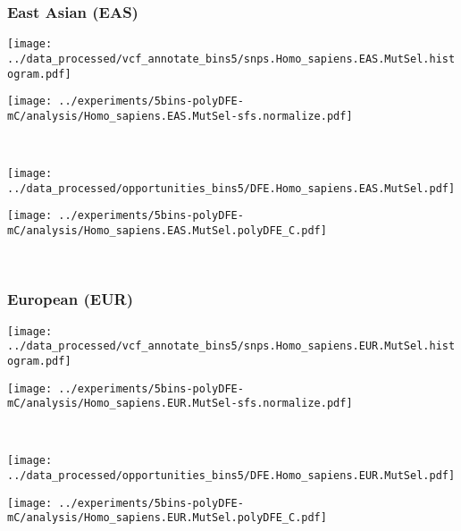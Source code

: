 \subsubsection{East Asian (EAS)}

\begin{minipage}{0.49\linewidth}
    \texttt{[image: ../data\_processed/vcf\_annotate\_bins5/snps.Homo\_sapiens.EAS.MutSel.histogram.pdf]}
\end{minipage}
\begin{minipage}{0.49\linewidth}
    \texttt{[image: ../experiments/5bins-polyDFE-mC/analysis/Homo\_sapiens.EAS.MutSel-sfs.normalize.pdf]}
\end{minipage}
\\
\begin{minipage}{0.49\linewidth}
    \texttt{[image: ../data\_processed/opportunities\_bins5/DFE.Homo\_sapiens.EAS.MutSel.pdf]}
\end{minipage}
\begin{minipage}{0.49\linewidth}
    \texttt{[image: ../experiments/5bins-polyDFE-mC/analysis/Homo\_sapiens.EAS.MutSel.polyDFE\_C.pdf]}
\end{minipage}
\\

\subsubsection{European (EUR)}

\begin{minipage}{0.49\linewidth}
    \texttt{[image: ../data\_processed/vcf\_annotate\_bins5/snps.Homo\_sapiens.EUR.MutSel.histogram.pdf]}
\end{minipage}
\begin{minipage}{0.49\linewidth}
    \texttt{[image: ../experiments/5bins-polyDFE-mC/analysis/Homo\_sapiens.EUR.MutSel-sfs.normalize.pdf]}
\end{minipage}
\\
\begin{minipage}{0.49\linewidth}
    \texttt{[image: ../data\_processed/opportunities\_bins5/DFE.Homo\_sapiens.EUR.MutSel.pdf]}
\end{minipage}
\begin{minipage}{0.49\linewidth}
    \texttt{[image: ../experiments/5bins-polyDFE-mC/analysis/Homo\_sapiens.EUR.MutSel.polyDFE\_C.pdf]}
\end{minipage}
\\

